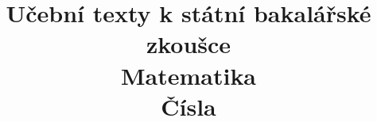 \clearpage

\clearpage

\title{\LARGE Učební texty k státní bakalářské zkoušce \\ Matematika \\ Čísla}



\maketitle

\newpage
\setcounter{section}{0}



